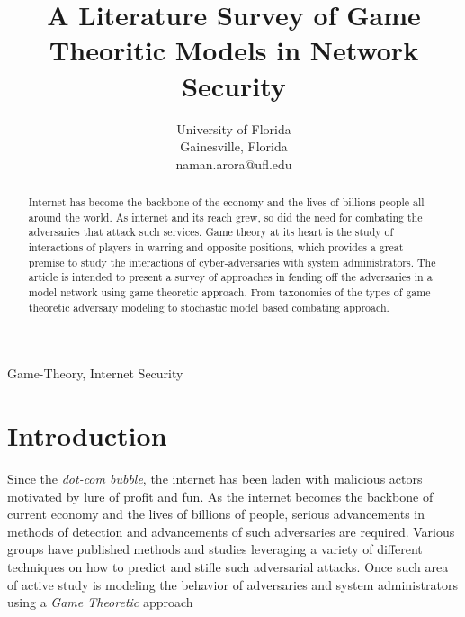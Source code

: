 \documentclass[conference]{IEEEtran}
\begin{document}
\title{A Literature Survey of Game Theoritic Models in Network Security}

\author{
        University of Florida\\
        Gainesville, Florida \\
        naman.arora@ufl.edu
        }

\maketitle

\begin{abstract}
        Internet has become the backbone of the economy and the lives of billions people all around the world.
        As internet and its reach grew, so did the need for combating the adversaries that attack such services.
        Game theory at its heart is the study of interactions of players in warring and opposite positions, which provides a great premise to study the interactions of cyber-adversaries with system administrators.
        The article is intended to present a survey of approaches in fending off the adversaries in a model network using game theoretic approach.
        From taxonomies of the types of game theoretic adversary modeling to stochastic model based combating approach.
\end{abstract}

\begin{IEEEkeywords}
        Game-Theory, Internet Security
\end{IEEEkeywords}

\section*{Introduction}
Since the \textit{dot-com bubble}, the internet has been laden with malicious actors motivated by lure of profit and fun.
As the internet becomes the backbone of current economy and the lives of billions of people, serious advancements in methods of detection and advancements of such adversaries are required.
Various groups have published methods and studies leveraging a variety of different techniques on how to predict and stifle such adversarial attacks.
Once such area of active study is modeling the behavior of adversaries and system administrators using a \textit{Game Theoretic} approach
\end{document}
